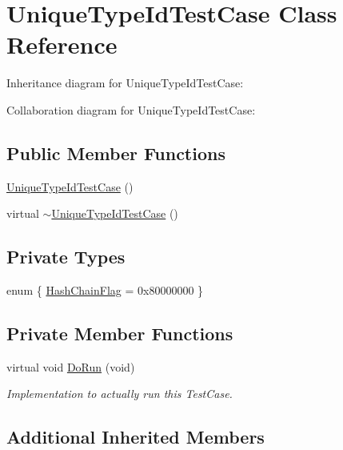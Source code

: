 \hypertarget{classUniqueTypeIdTestCase}{}\section{Unique\+Type\+Id\+Test\+Case Class Reference}
\label{classUniqueTypeIdTestCase}


Inheritance diagram for Unique\+Type\+Id\+Test\+Case\+:


Collaboration diagram for Unique\+Type\+Id\+Test\+Case\+:
\subsection*{Public Member Functions}
\begin{DoxyCompactItemize}
\item 
\hyperlink{classUniqueTypeIdTestCase_acb36a3d5f35560c072024047a87f48f0}{Unique\+Type\+Id\+Test\+Case} ()
\item 
virtual \hyperlink{classUniqueTypeIdTestCase_ac93f3306332eb1e03d6e421cfd12e135}{$\sim$\+Unique\+Type\+Id\+Test\+Case} ()
\end{DoxyCompactItemize}
\subsection*{Private Types}
\begin{DoxyCompactItemize}
\item 
enum \{ \hyperlink{classUniqueTypeIdTestCase_a66432bbd4685184c59237de907a1096ea81f1d39e319b1f8cce25024d66f099cd}{Hash\+Chain\+Flag} = 0x80000000
 \}
\end{DoxyCompactItemize}
\subsection*{Private Member Functions}
\begin{DoxyCompactItemize}
\item 
virtual void \hyperlink{classUniqueTypeIdTestCase_aaaf0de0c7f78d4143b4e205828cc9726}{Do\+Run} (void)
\begin{DoxyCompactList}\small\item\em Implementation to actually run this Test\+Case. \end{DoxyCompactList}\end{DoxyCompactItemize}
\subsection*{Additional Inherited Members}


